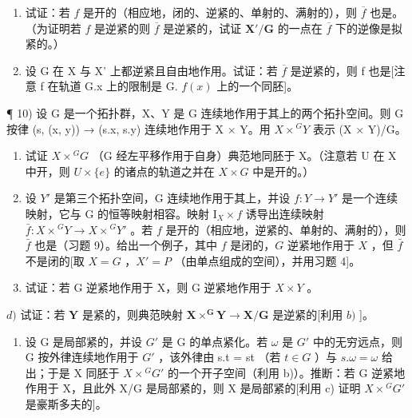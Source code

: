 \begin{enumerate}
\def\labelenumi{\alph{enumi})}
\item
  试证：若 \(f\) 是开的（相应地，闭的、逆紧的、单射的、满射的），则 \(\overline{f}\) 也是。（为证明若 \(f\) 是逆紧的则 \(\overline{f}\) 是逆紧的，试证 \(\mathbf{X}' / \mathbf{G}\) 的一点在 \(\overline{f}\) 下的逆像是拟紧的。）
\item
  设 G 在 X 与 X' 上都逆紧且自由地作用。试证：若 \(\overline{f}\) 是逆紧的，则 f 也是{[}注意 f 在轨道 G.x 上的限制是 G. \(f(x)\) 上的一个同胚{]}。
\end{enumerate}

¶ 10) 设 G 是一个拓扑群，X、Y 是 G 连续地作用于其上的两个拓扑空间。则 G 按律 (s, (x, y)) → (s.x, s.y) 连续地作用于 X × Y。用 \(X \times {}^{G}Y\) 表示 (X × Y)/G。

\begin{enumerate}
\def\labelenumi{\alph{enumi})}
\item
  试证 \(X \times {}^{G}G\) （G 经左平移作用于自身）典范地同胚于 X。（注意若 U 在 X 中开，则 \(U \times \{e\}\) 的诸点的轨道之并在 \(X \times G\) 中是开的。）
\item
  设 \(Y'\) 是第三个拓扑空间，G 连续地作用于其上，并设 \(f: Y \to Y'\) 是一个连续映射，它与 G 的恒等映射相容。映射 \(\mathrm{I}_{X} \times f\) 诱导出连续映射 \(\bar{f}: X \times {}^{G}Y \to X \times {}^{G}Y'\) 。若 \(f\) 是开的（相应地，逆紧的、单射的、满射的），则 \(\bar{f}\) 也是（习题 9）。给出一个例子，其中 \(f\) 是闭的，\(G\) 逆紧地作用于 \(X\) ，但 \(\bar{f}\) 不是闭的{[}取 \(X = G\) ，\(X' = P\) （由单点组成的空间），并用习题 4{]}。
\item
  试证：若 G 逆紧地作用于 X，则 G 逆紧地作用于 \(X \times Y\) 。
\end{enumerate}

\(d)\) 试证：若 \(\mathbf{Y}\) 是紧的，则典范映射 \(\mathbf{X} \times^{\mathbf{G}}\mathbf{Y} \to \mathbf{X}/\mathbf{G}\) 是逆紧的{[}利用 \(b)\) {]}。

\begin{enumerate}
\def\labelenumi{\alph{enumi})}
\setcounter{enumi}{4}
\tightlist
\item
  设 G 是局部紧的，并设 \(G'\) 是 G 的单点紧化。若 \(\omega\) 是 \(G'\) 中的无穷远点，则 G 按外律连续地作用于 \(G'\) ，该外律由 s.t = st （若 \(t \in G\) ）与 \(s.\omega = \omega\) 给出；于是 X 同胚于 \(X \times {}^{G}G'\) 的一个开子空间（利用 b)）。推断：若 G 逆紧地作用于 X，且此外 X/G 是局部紧的，则 X 是局部紧的{[}利用 c) 证明 \(X \times {}^{G}G'\) 是豪斯多夫的{]}。
\end{enumerate}

